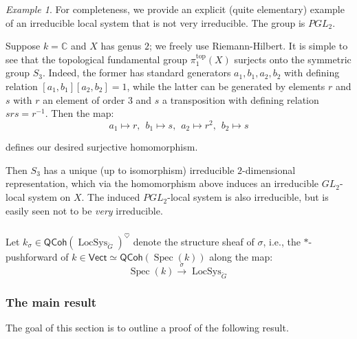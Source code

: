 \documentclass[reqno,11pt]{amsart}
\numberwithin{equation}{subsection}
\theoremstyle{remark}
\newtheorem{example}[thm]{Example}
\newcommand{\xar}[1]{\xrightarrow{#1}}
\newcommand{\bC}{{\mathbb C}}
\newcommand{\on}{\operatorname}
\newcommand{\Spec}{\on{Spec}}
\newcommand{\Vect}{\mathsf{Vect}}
\newcommand{\LocSys}{\on{LocSys}}
\newcommand{\heart}{\heartsuit}
\newcommand{\QCoh}{\mathsf{QCoh}}
\begin{document}
\begin{example}

For completeness, we provide an explicit (quite elementary)
example of an irreducible local system that is
not very irreducible. The group is $PGL_2$.

Suppose $k = \bC$ and $X$ has genus $2$; we freely use Riemann-Hilbert. 
It is simple to see
that the topological fundamental
group $\pi_1^{\on{top}}(X)$ surjects onto the symmetric group $S_3$.
Indeed, the former has 
standard generators $a_1,b_1,a_2,b_2$ with defining relation
$[a_1,b_1][a_2,b_2] = 1$, while the latter
can be generated by elements $r$ and $s$ with 
$r$ an element of order $3$ and
$s$ a transposition with defining relation $srs = r^{-1}$.
Then the map:
%
\[
a_1 \mapsto r, \hspace{5pt}
b_1 \mapsto s, \hspace{5pt}
a_2 \mapsto r^2, \hspace{5pt}
b_2 \mapsto s
\]

\noindent defines our desired surjective homomorphism.

Then $S_3$ has a unique (up to isomorphism) irreducible 
$2$-dimensional representation, which via the homomorphism
above induces an irreducible
$GL_2$-local system on $X$. The induced $PGL_2$-local system
is also irreducible, but is easily seen not to be 
\emph{very} irreducible. 

\end{example}

\subsubsection{}

Let $k_{\sigma} \in \QCoh(\LocSys_{\check{G}})^{\heart}$ denote the structure sheaf
of $\sigma$, i.e., the $*$-pushforward of $k \in \Vect \simeq \QCoh(\Spec(k))$ along the map:
%
\[
\Spec(k) \xar{\sigma} \LocSys_{\check{G}}
\]

\subsubsection{The main result}

The goal of this section is to outline a proof of the following result.
\end{document}
